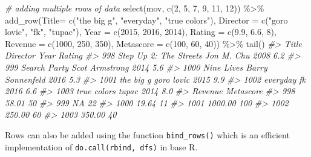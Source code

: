 \documentclass[
]{book}
\newenvironment{Shaded}{\begin{snugshade}}{\end{snugshade}}
\newcommand{\AttributeTok}[1]{\textcolor[rgb]{0.77,0.63,0.00}{#1}}
\newcommand{\CommentTok}[1]{\textcolor[rgb]{0.56,0.35,0.01}{\textit{#1}}}
\newcommand{\DecValTok}[1]{\textcolor[rgb]{0.00,0.00,0.81}{#1}}
\newcommand{\FloatTok}[1]{\textcolor[rgb]{0.00,0.00,0.81}{#1}}
\newcommand{\FunctionTok}[1]{\textcolor[rgb]{0.00,0.00,0.00}{#1}}
\newcommand{\NormalTok}[1]{#1}
\newcommand{\SpecialCharTok}[1]{\textcolor[rgb]{0.00,0.00,0.00}{#1}}
\newcommand{\StringTok}[1]{\textcolor[rgb]{0.31,0.60,0.02}{#1}}
\begin{document}
\begin{Shaded}
\begin{Highlighting}[]
\CommentTok{\# adding multiple rows of data}
\FunctionTok{select}\NormalTok{(mov, }\FunctionTok{c}\NormalTok{(}\DecValTok{2}\NormalTok{, }\DecValTok{5}\NormalTok{, }\DecValTok{7}\NormalTok{, }\DecValTok{9}\NormalTok{, }\DecValTok{11}\NormalTok{, }\DecValTok{12}\NormalTok{)) }\SpecialCharTok{\%\textgreater{}\%}
  \FunctionTok{add\_row}\NormalTok{(}\AttributeTok{Title=} \FunctionTok{c}\NormalTok{(}\StringTok{"the big g"}\NormalTok{, }\StringTok{"everyday"}\NormalTok{, }\StringTok{"true colors"}\NormalTok{), }
          \AttributeTok{Director =} \FunctionTok{c}\NormalTok{(}\StringTok{"goro lovic"}\NormalTok{, }\StringTok{"fk"}\NormalTok{, }\StringTok{"tupac"}\NormalTok{), }
          \AttributeTok{Year =} \FunctionTok{c}\NormalTok{(}\DecValTok{2015}\NormalTok{, }\DecValTok{2016}\NormalTok{, }\DecValTok{2014}\NormalTok{), }
          \AttributeTok{Rating =} \FunctionTok{c}\NormalTok{(}\FloatTok{9.9}\NormalTok{, }\FloatTok{6.6}\NormalTok{, }\DecValTok{8}\NormalTok{), }
          \AttributeTok{Revenue =} \FunctionTok{c}\NormalTok{(}\DecValTok{1000}\NormalTok{, }\DecValTok{250}\NormalTok{, }\DecValTok{350}\NormalTok{), }
          \AttributeTok{Metascore =} \FunctionTok{c}\NormalTok{(}\DecValTok{100}\NormalTok{, }\DecValTok{60}\NormalTok{, }\DecValTok{40}\NormalTok{)) }\SpecialCharTok{\%\textgreater{}\%}
  \FunctionTok{tail}\NormalTok{()}
\CommentTok{\#\textgreater{}                       Title         Director Year Rating}
\CommentTok{\#\textgreater{} 998  Step Up 2: The Streets       Jon M. Chu 2008    6.2}
\CommentTok{\#\textgreater{} 999            Search Party   Scot Armstrong 2014    5.6}
\CommentTok{\#\textgreater{} 1000             Nine Lives Barry Sonnenfeld 2016    5.3}
\CommentTok{\#\textgreater{} 1001              the big g       goro lovic 2015    9.9}
\CommentTok{\#\textgreater{} 1002               everyday               fk 2016    6.6}
\CommentTok{\#\textgreater{} 1003            true colors            tupac 2014    8.0}
\CommentTok{\#\textgreater{}      Revenue Metascore}
\CommentTok{\#\textgreater{} 998    58.01        50}
\CommentTok{\#\textgreater{} 999       NA        22}
\CommentTok{\#\textgreater{} 1000   19.64        11}
\CommentTok{\#\textgreater{} 1001 1000.00       100}
\CommentTok{\#\textgreater{} 1002  250.00        60}
\CommentTok{\#\textgreater{} 1003  350.00        40}
\end{Highlighting}
\end{Shaded}

Rows can also be added using the function \texttt{bind\_rows()} which is an efficient implementation of \texttt{do.call(rbind,\ dfs)} in base R.
\end{document}
